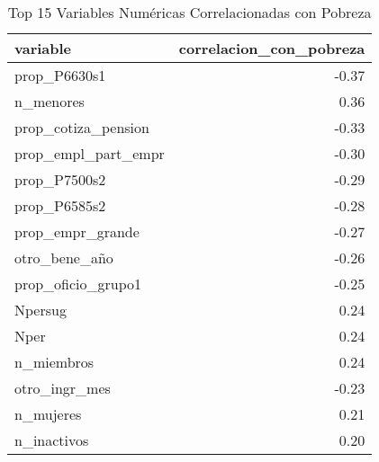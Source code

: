 \begin{table}[ht]
\centering
\begin{tabular}{lr}
  \toprule
variable & correlacion\_con\_pobreza \\ 
  \midrule
prop\_P6630s1 & -0.37 \\ 
  n\_menores & 0.36 \\ 
  prop\_cotiza\_pension & -0.33 \\ 
  prop\_empl\_part\_empr & -0.30 \\ 
  prop\_P7500s2 & -0.29 \\ 
  prop\_P6585s2 & -0.28 \\ 
  prop\_empr\_grande & -0.27 \\ 
  otro\_bene\_año & -0.26 \\ 
  prop\_oficio\_grupo1 & -0.25 \\ 
  Npersug & 0.24 \\ 
  Nper & 0.24 \\ 
  n\_miembros & 0.24 \\ 
  otro\_ingr\_mes & -0.23 \\ 
  n\_mujeres & 0.21 \\ 
  n\_inactivos & 0.20 \\ 
   \bottomrule
\end{tabular}
\caption{Top 15 Variables Numéricas Correlacionadas con Pobreza} 
\label{tab:poverty_correlation}
\end{table}
